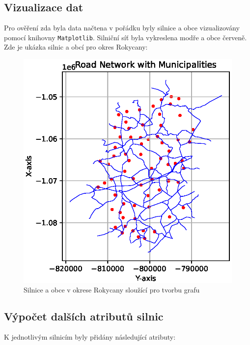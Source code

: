 \subsection{Vizualizace dat}
Pro ověření zda byla data načtena v pořádku byly silnice a obce vizualizovány pomocí knihovny \texttt{Matplotlib}. Silniční síť byla vykreslena modře a obce červeně. Zde je ukázka silnic a obcí pro okres Rokycany:
\begin{figure}[H]
    \centering
    \includegraphics[width=\textwidth]{images/road_network_with_municipalities.eps}
    \caption{Silnice a obce v okrese Rokycany sloužící pro tvorbu grafu}
\end{figure}
\subsection{Výpočet dalších atributů silnic}
K jednotlivým silnicím byly přidány následující atributy:

